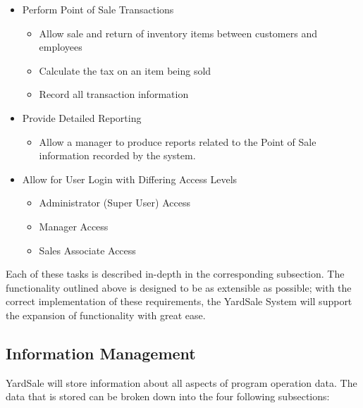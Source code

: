 \documentclass{report}
\begin{document}
\begin{itemize}
\begin{itemize}
\begin{itemize}
{                    criteria}
                    \item{Associate values with a transaction}
                \end{itemize}
            \end{itemize}
            \item{Perform Point of Sale Transactions}
            \begin{itemize}
                \item{ Allow sale and return of inventory items between
                customers and employees }
                \item{ Calculate the tax on an item being sold }
                \item{ Record all transaction information }
            \end{itemize}
            \item{Provide Detailed Reporting}
            \begin{itemize}
                \item Allow a manager to produce reports
                related to the Point of Sale information
                recorded by the system.
            \end{itemize}
            \item{Allow for User Login with Differing Access Levels}
            \begin{itemize}
                \item Administrator (Super User) Access
                \item Manager Access
                \item Sales Associate Access
            \end{itemize}
        \end{itemize}


        Each of these tasks is described in-depth in the corresponding
        subsection. The functionality outlined above is designed to be as
        extensible as possible; with the correct implementation of these
        requirements, the YardSale System will support the expansion
        of functionality with great ease.

        \subsection{Information Management}
            YardSale will store information about all aspects of program operation
            data. The data that is stored can be broken down into the four following
            subsections:
\end{document}
